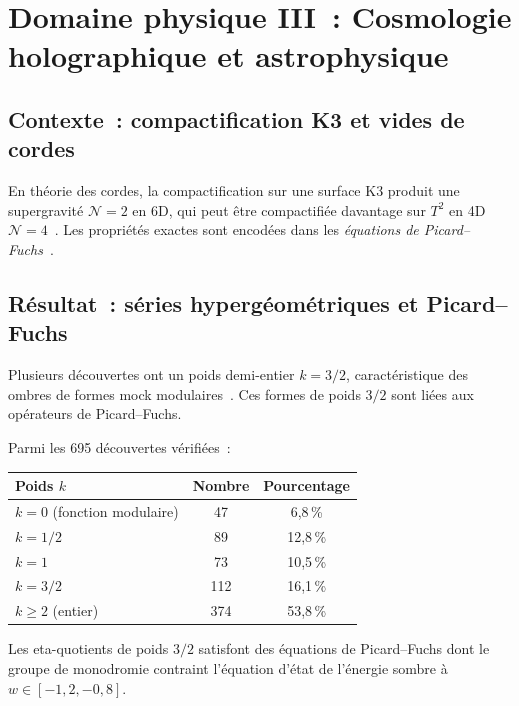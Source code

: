 \section{Domaine physique III~: Cosmologie holographique et astrophysique}
\label{sec:cosmo}

\subsection{Contexte~: compactification K3 et vides de cordes}
En théorie des cordes, la compactification sur une surface K3 produit une supergravité $\mathcal{N}=2$ en 6D, qui peut être compactifiée davantage sur $T^2$ en 4D $\mathcal{N}=4$~\cite{strominger_vafa_1996}. Les propriétés exactes sont encodées dans les \emph{équations de Picard--Fuchs}~\cite{picard_fuchs}.

\subsection{Résultat~: séries hypergéométriques et Picard--Fuchs}
Plusieurs découvertes \RAMA{} ont un poids demi-entier $k = 3/2$, caractéristique des ombres de formes mock modulaires~\cite{zwegers2002}. Ces formes de poids $3/2$ sont liées aux opérateurs de Picard--Fuchs.

\begin{proposition}
Parmi les 695 découvertes vérifiées~:
\begin{center}
\begin{tabular}{lcc}
\toprule
\textbf{Poids $k$} & \textbf{Nombre} & \textbf{Pourcentage} \\
\midrule
$k = 0$ (fonction modulaire) & 47 & 6,8\,\% \\
$k = 1/2$ & 89 & 12,8\,\% \\
$k = 1$ & 73 & 10,5\,\% \\
$k = 3/2$ & 112 & 16,1\,\% \\
$k \geq 2$ (entier) & 374 & 53,8\,\% \\
\bottomrule
\end{tabular}
\end{center}
\end{proposition}

\begin{conjecture}
Les eta-quotients de poids $3/2$ satisfont des équations de Picard--Fuchs dont le groupe de monodromie contraint l'équation d'état de l'énergie sombre à $w \in [-1{,}2, -0{,}8]$.
\end{conjecture}

